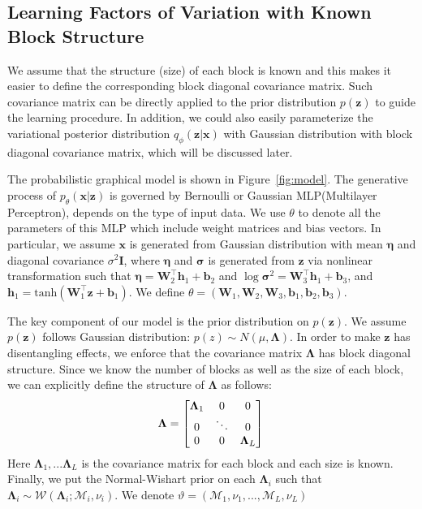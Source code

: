 \subsection{Learning Factors of Variation with Known Block Structure}
We assume that the structure (size) of each block is known and this makes it easier to define the corresponding block diagonal covariance matrix. Such covariance matrix can be directly applied to the prior distribution $p(\mathbf{z})$ to guide the learning procedure. In addition, we could also easily parameterize the variational posterior distribution $q_{\phi}(\mathbf{z}|\mathbf{x})$ with Gaussian distribution with block diagonal covariance matrix, which will be discussed later.

The probabilistic graphical model is shown in Figure~\ref{fig:model}.
The generative process of $p_{\theta}(\mathbf{x}|\mathbf{z})$ is governed by Bernoulli or Gaussian MLP(Multilayer Perceptron), depends on the type of input data. We use $\theta$ to denote all the parameters of this MLP which include weight matrices and bias vectors. In particular, we assume $\mathbf{x}$ is generated from Gaussian distribution with mean $\mathbf{\eta}$ and diagonal covariance $\sigma^2\mathbf{I}$, where $\mathbf{\eta}$ and $\mathbf{\sigma}$ is generated from $\mathbf{z}$ via nonlinear transformation such that $\mathbf{\eta} = \mathbf{W}_2^\top\mathbf{h}_1 + \mathbf{b}_2$ and $\log \mathbf{\sigma}^2 = \mathbf{W}_3^\top\mathbf{h}_1 + \mathbf{b}_3$, and $\mathbf{h}_1 = \mbox{tanh}(\mathbf{W}_1^\top\mathbf{z} + \mathbf{b}_1)$. We define $\theta=(\mathbf{W}_1, \mathbf{W}_2,\mathbf{W}_3, \mathbf{b}_1, \mathbf{b}_2,\mathbf{b}_3)$.

The key component of our model is the prior distribution on $p(\mathbf{z})$. We assume $p(\mathbf{z})$ follows Gaussian distribution: $p(z)\sim N(\mu, \mathbf{\Lambda})$. In order to make $\mathbf{z}$ has disentangling effects, we enforce that the covariance matrix $\mathbf{\Lambda}$ has block diagonal structure. Since we know the number of blocks as well as the size of each block, we can explicitly define the structure of $\mathbf{\Lambda}$ as follows:
\begin{equation*}
\mathbf{\Lambda} = \begin{bmatrix}
\mathbf{\Lambda}_1 & 0 & 0 \\
0 & \ddots & 0  \\
0 & 0 & \mathbf{\Lambda}_{L}
\end{bmatrix} \\
\end{equation*}
Here $\mathbf{\Lambda}_1,...\mathbf{\Lambda}_L$ is the covariance matrix for each block and each size is known. Finally, we put the Normal-Wishart prior on each $\mathbf{\Lambda}_i$ such that $\mathbf{\mathbf{\Lambda}}_{i} \sim \mathcal{W}(\mathbf{\Lambda}_{i}; \mathcal{M}_{i}, \nu_{i})$. We denote $\vartheta=(\mathcal{M}_{1}, \nu_{1},...,\mathcal{M}_{L}, \nu_{L})$

